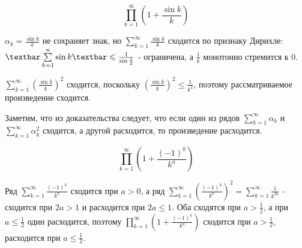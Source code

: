 \documentclass[../../main.tex]{subfiles}
\begin{document}
	\begin{example}
		\[\prod\limits_{k = 1}^{\infty} \left(1 + \frac{\sin k}{k}\right)\]
		
		$\alpha_k = \frac{\sin k}{k}$ не сохраняет знак, но $\sum\limits_{k = 
		1}^{\infty} \frac{\sin k}{k}$ сходится по признаку Дирихле: $\textbar 
		\sum\limits_{k = 1}^{n} \sin k \textbar \leq \frac{1}{\sin \frac{1}{2}}$ - 
		ограничена, а $\frac{1}{k}$ монотонно стремится к 0.
		
		$\sum\limits_{k = 1}^{\infty} \left(\frac{\sin k}{k}\right)^2$ сходится, 
		поскольку $\left(\frac{\sin k}{k}\right)^2 \leq \frac{1}{k^2}$, поэтому 
		рассматриваемое произведение сходится.
	\end{example}

	Заметим, что из доказательства следует, что если один из рядов 
	$\sum\limits_{k = 1}^{\infty} \alpha_k$ и $\sum\limits_{k = 1}^{\infty} 
	\alpha_k^2$ сходится, а другой расходится, то произведение расходится.
	
	\begin{example}
		\[\prod\limits_{k = 1}^{\infty} \left(1 + \frac{(-1)^k}{k^a}\right)\]
		
		Ряд $\sum\limits_{k = 1}^{\infty} \frac{(-1)^k}{k^a}$ сходится при $a > 0$, 
		а ряд $\sum\limits_{k = 1}^{\infty} \left(\frac{(-1)^k}{k^a}\right)^2 = 
		\sum\limits_{k = 1}^{\infty} \frac{1}{k^{2a}}$ - сходится при $2a > 1$ и 
		расходится при $2a \leq 1$. Оба сходятся при $a > \frac{1}{2}$, а при $a 
		\leq \frac{1}{2}$ один расходится, поэтому $\prod\limits_{k = 1}^{\infty} 
		\left(1 + \frac{(-1)^k}{k^a}\right)$ сходится при $a > \frac{1}{2}$, 
		расходится при $a \leq \frac{1}{2}$.
	\end{example}
	
\end{document}

